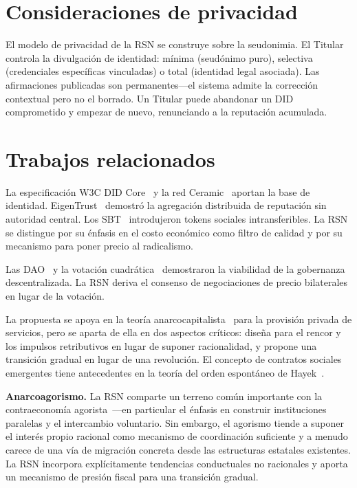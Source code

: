 \documentclass[11pt,a4paper,twocolumn]{article}
\begin{document}
\section{Consideraciones de privacidad}

El modelo de privacidad de la RSN se construye sobre la seudonimia. El Titular controla la divulgación de identidad: mínima (seudónimo puro), selectiva (credenciales específicas vinculadas) o total (identidad legal asociada). Las afirmaciones publicadas son permanentes---el sistema admite la corrección contextual pero no el borrado. Un Titular puede abandonar un DID comprometido y empezar de nuevo, renunciando a la reputación acumulada.

\section{Trabajos relacionados}

La especificación W3C DID Core~\cite{did2022} y la red Ceramic~\cite{ceramic2023} aportan la base de identidad. EigenTrust~\cite{kamvar2003} demostró la agregación distribuida de reputación sin autoridad central. Los SBT~\cite{weyl2022} introdujeron tokens sociales intransferibles. La RSN se distingue por su énfasis en el costo económico como filtro de calidad y por su mecanismo para poner precio al radicalismo.

Las DAO~\cite{buterin2014} y la votación cuadrática~\cite{buterin2019} demostraron la viabilidad de la gobernanza descentralizada. La RSN deriva el consenso de negociaciones de precio bilaterales en lugar de la votación.

La propuesta se apoya en la teoría anarcocapitalista~\cite{rothbard1973,hoppe2001} para la provisión privada de servicios, pero se aparta de ella en dos aspectos críticos: diseña para el rencor y los impulsos retributivos en lugar de suponer racionalidad, y propone una transición gradual en lugar de una revolución. El concepto de contratos sociales emergentes tiene antecedentes en la teoría del orden espontáneo de Hayek~\cite{hayek1973}.

\textbf{Anarcoagorismo.} La RSN comparte un terreno común importante con la contraeconomía agorista~\cite{konkin2006}---en particular el énfasis en construir instituciones paralelas y el intercambio voluntario. Sin embargo, el agorismo tiende a suponer el interés propio racional como mecanismo de coordinación suficiente y a menudo carece de una vía de migración concreta desde las estructuras estatales existentes. La RSN incorpora explícitamente tendencias conductuales no racionales y aporta un mecanismo de presión fiscal para una transición gradual.
\end{document}
